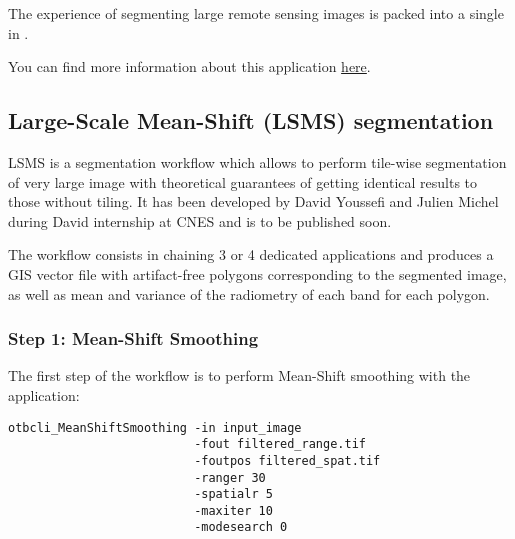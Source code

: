 The experience of segmenting large remote sensing images is packed into a single
 in \app.

You can find more information about this application
\href{http://blog.orfeo-toolbox.org/preview/coming-next-large-scale-segmentation}{here}.





\subsection{Large-Scale Mean-Shift (LSMS) segmentation}

LSMS is a segmentation workflow which allows to perform tile-wise
segmentation of very large image with theoretical guarantees of
getting identical results to those without tiling. It has been
developed by David Youssefi and Julien Michel during David internship
at CNES and is to be published soon.

The workflow consists in chaining 3 or 4 dedicated applications and
produces a GIS vector file with artifact-free polygons corresponding
to the segmented image, as well as mean and variance of the radiometry
of each band for each polygon.

\subsubsection{Step 1: Mean-Shift Smoothing}

The first step of the workflow is to perform Mean-Shift smoothing with
the  application:

\begin{verbatim}
otbcli_MeanShiftSmoothing -in input_image 
                          -fout filtered_range.tif 
                          -foutpos filtered_spat.tif 
                          -ranger 30 
                          -spatialr 5 
                          -maxiter 10 
                          -modesearch 0
\end{verbatim}

